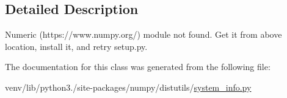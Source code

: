 \subsection{Detailed Description}
\begin{DoxyVerb}Numeric (https://www.numpy.org/) module not found.
Get it from above location, install it, and retry setup.py.\end{DoxyVerb}
 

The documentation for this class was generated from the following file\+:\begin{DoxyCompactItemize}
\item 
venv/lib/python3./site-\/packages/numpy/distutils/\hyperlink{system__info_8py}{system\+\_\+info.\+py}\end{DoxyCompactItemize}
